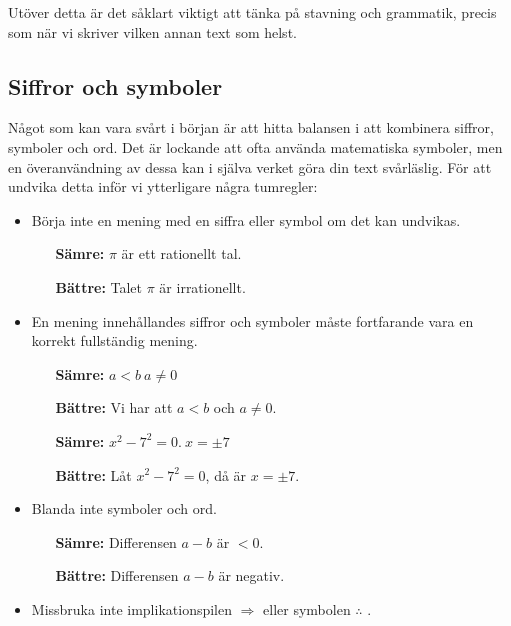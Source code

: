 \documentclass[titlepage]{article}
\begin{document}
Utöver detta är det såklart viktigt att tänka på stavning och grammatik, precis som när vi skriver vilken annan text som helst.


\subsection{Siffror och symboler}

Något som kan vara svårt i början är att hitta balansen i att kombinera siffror, symboler och ord. Det är lockande att ofta använda matematiska symboler, men en överanvändning av dessa kan i själva verket göra din text svårläslig. För att undvika detta inför vi ytterligare några tumregler:

\begin{itemize}
    \item Börja inte en mening med en siffra eller symbol om det kan undvikas.
        \begin{itemize}[leftmargin=20mm]
            \item[\textbf{Sämre:}] $\pi$ är ett rationellt tal.
            \item[\textbf{Bättre:}] Talet $\pi$ är irrationellt. 
        \end{itemize}
    \item En mening innehållandes siffror och symboler måste fortfarande vara en korrekt fullständig mening.
        \begin{itemize}[leftmargin=20mm]
            \item[\textbf{Sämre:}] $a < b \: a \neq 0$
            \item[\textbf{Bättre:}] Vi har att $a<b$ och $a \neq 0$.
            \vspace{2mm}
            \item[\textbf{Sämre:}] $x^2 - 7^2 = 0.\: x = \pm 7$
            \item[\textbf{Bättre:}] Låt $x^2 - 7^2 = 0$, då är $x = \pm 7.$
        \end{itemize}
    \item Blanda inte symboler och ord.
        \begin{itemize}[leftmargin=20mm]
            \item[\textbf{Sämre:}] Differensen $a-b$ är $<0$.
            \item[\textbf{Bättre:}] Differensen $a-b$ är negativ.
        \end{itemize}
    \item Missbruka inte implikationspilen $\Rightarrow$ eller symbolen $\therefore$ .

\end{itemize}
\end{document}
